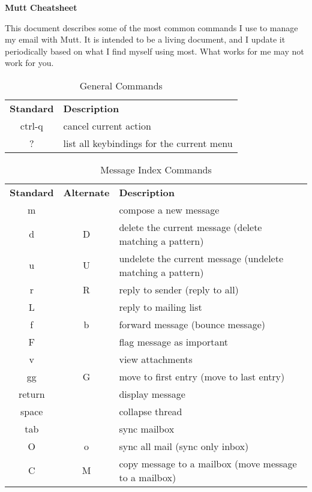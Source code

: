 \documentclass{article}
\begin{document}
\begin{center}
  \textbf{Mutt Cheatsheet}
\end{center}

\footnotesize This document describes some of the most common commands I use
to manage my email with Mutt.  It is intended to be a living document, and I
update it periodically based on what I find myself using most.  What works for
me may not work for you.


\begin{table*}[!b]
\renewcommand{\arraystretch}{1.3}
\caption{General Commands}
\label{tab:general}
\footnotesize
\begin{tabulary}{\textwidth}{CL}
  \textbf{Standard} & \textbf{Description}\\
  ctrl-q & cancel current action\\
  ? & list all keybindings for the current menu\\
\end{tabulary}
\end{table*}


\begin{table*}[!b]
\renewcommand{\arraystretch}{1.3}
\caption{Message Index Commands}
\label{tab:message_index}
\footnotesize
\begin{tabulary}{\textwidth}{CCL}
  \textbf{Standard} & \textbf{Alternate} & \textbf{Description}\\
  m & & compose a new message\\
  d & D & delete the current message (delete matching a pattern)\\
  u & U & undelete the current message (undelete matching a pattern)\\
  r & R & reply to sender (reply to all)\\
  L & & reply to mailing list\\
  f & b & forward message (bounce message)\\
  F & & flag message as important\\
  v & & view attachments\\
  gg & G & move to first entry (move to last entry)\\
  return & & display message\\
  space & & collapse thread\\
  tab & & sync mailbox\\
  O & o & sync all mail (sync only inbox)\\
  C & M & copy message to a mailbox (move message to a mailbox)\\
\end{tabulary}
\end{table*}
\end{document}
